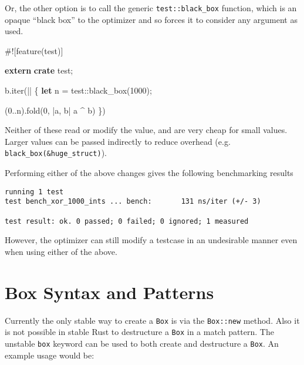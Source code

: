 \documentclass[a4paper,]{book}
\newenvironment{Shaded}{\begin{snugshade}}{\end{snugshade}}
\newcommand{\KeywordTok}[1]{\textcolor[rgb]{0.13,0.29,0.53}{\textbf{{#1}}}}
\newcommand{\DecValTok}[1]{\textcolor[rgb]{0.00,0.00,0.81}{{#1}}}
\newcommand{\AttributeTok}[1]{\textcolor[rgb]{0.77,0.63,0.00}{{#1}}}
\newcommand{\NormalTok}[1]{{#1}}
\begin{document}
Or, the other option is to call the generic \texttt{test::black\_box}
function, which is an opaque ``black box'' to the optimizer and so
forces it to consider any argument as used.

\begin{Shaded}
\begin{Highlighting}[]
\AttributeTok{#![}\NormalTok{feature}\AttributeTok{(}\NormalTok{test}\AttributeTok{)]}

\KeywordTok{extern} \KeywordTok{crate} \NormalTok{test;}

\NormalTok{b.iter(|| \{}
    \KeywordTok{let} \NormalTok{n = test::black_box(}\DecValTok{1000}\NormalTok{);}

    \NormalTok{(}\DecValTok{0.}\NormalTok{.n).fold(}\DecValTok{0}\NormalTok{, |a, b| a ^ b)}
\NormalTok{\})}
\end{Highlighting}
\end{Shaded}

Neither of these read or modify the value, and are very cheap for small
values. Larger values can be passed indirectly to reduce overhead (e.g.
\texttt{black\_box(\&huge\_struct)}).

Performing either of the above changes gives the following benchmarking
results

\begin{verbatim}
running 1 test
test bench_xor_1000_ints ... bench:       131 ns/iter (+/- 3)

test result: ok. 0 passed; 0 failed; 0 ignored; 1 measured
\end{verbatim}

However, the optimizer can still modify a testcase in an undesirable
manner even when using either of the above.

\section{Box Syntax and Patterns}\label{sec--box-syntax-and-patterns}

Currently the only stable way to create a \texttt{Box} is via the
\texttt{Box::new} method. Also it is not possible in stable Rust to
destructure a \texttt{Box} in a match pattern. The unstable \texttt{box}
keyword can be used to both create and destructure a \texttt{Box}. An
example usage would be:
\end{document}
